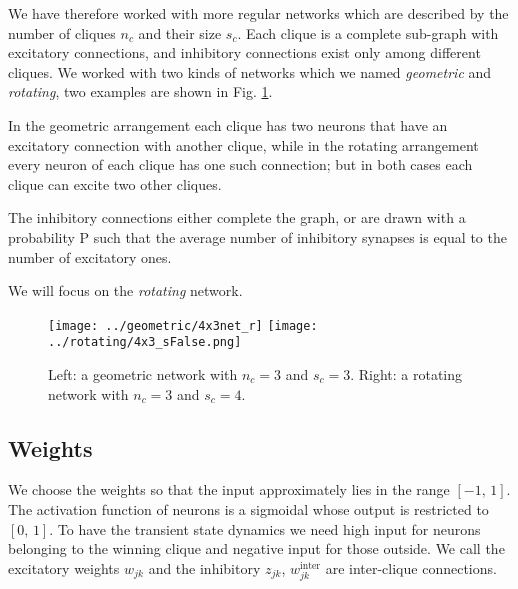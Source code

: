\documentclass[12pt,a4paper]{article}
\begin{document}
		We have therefore worked with more regular networks which are described by the number of cliques $n_c$ and their size $s_c$. Each clique is a complete sub-graph with excitatory connections, and inhibitory connections exist only among different cliques. We worked with two kinds of networks which we named \emph{geometric} and \emph{rotating}, two examples are shown in Fig. \ref{fig:network}. 
		
		In the geometric arrangement each clique has two neurons that have an excitatory connection with another clique, while in the rotating arrangement every neuron of each clique has one such connection; but in both cases each clique can excite two other cliques. 
		
		The inhibitory connections either complete the graph, or are drawn with a probability P such that the average number of inhibitory synapses is equal to the number of excitatory ones.
		
		We will focus on the \emph{rotating} network.
		\begin{figure}
			\centering
			\texttt{[image: ../geometric/4x3net\_r]}
			\texttt{[image: ../rotating/4x3\_sFalse.png]}
			\caption{Left: a geometric network with $n_c = 3$ and $s_c = 3$. Right: a rotating network with $n_c = 3$ and $s_c = 4$.}
			\label{fig:network}
		\end{figure}
		
	\subsection{Weights}
		We choose the weights so that the input approximately lies in the range $[-1, \, 1]$. The activation function of neurons is a sigmoidal whose output is restricted to $[0, \, 1]$. To have the transient state dynamics we need high input for neurons belonging to the winning clique and negative input for those outside.
		We call the excitatory weights $w_{jk}$ and the inhibitory $z_{jk}$, $w_{jk}^{\text{inter}}$ are inter-clique connections.
		
		
		
		\newpage
		\printbibliography
\end{document}

